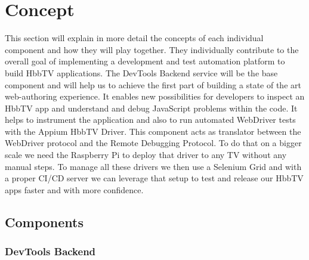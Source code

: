 %
%

\chapter{Concept\label{cha:concept}}

This section will explain in more detail the concepts of each individual component and how they will play together. They individually contribute to the overall goal of implementing a development and test automation platform to build HbbTV applications. The DevTools Backend service will be the base component and will help us to achieve the first part of building a state of the art web-authoring experience. It enables new possibilities for developers to inspect an HbbTV app and understand and debug JavaScript problems within the code. It helps to instrument the application and also to run automated WebDriver tests with the Appium HbbTV Driver. This component acts as translator between the WebDriver protocol and the Remote Debugging Protocol. To do that on a bigger scale we need the Raspberry Pi to deploy that driver to any TV without any manual steps. To manage all these drivers we then use a Selenium Grid and with a proper CI/CD server we can leverage that setup to test and release our HbbTV apps faster and with more confidence.

\section{Components\label{sec:components}}

\subsection{DevTools Backend\label{sec:devtoolsbackend}}

